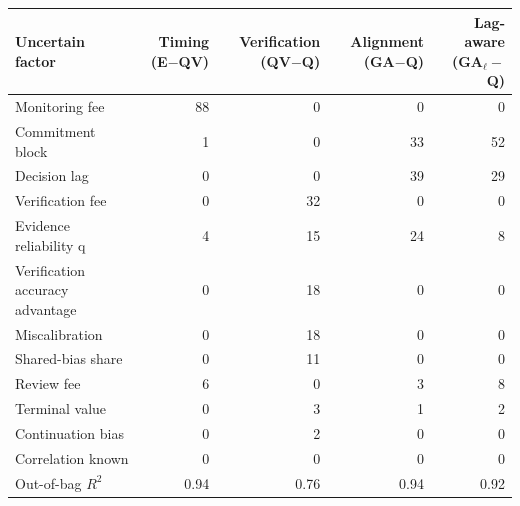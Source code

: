 \begin{tabular}{@{}lrrrr@{}}
\toprule
Uncertain factor & Timing (E$-$QV) & Verification (QV$-$Q) & Alignment (GA$-$Q) & Lag-aware (GA$_\ell-$Q) \\
\midrule
Monitoring fee & 88 & 0 & 0 & 0 \\
Commitment block & 1 & 0 & 33 & 52 \\
Decision lag & 0 & 0 & 39 & 29 \\
Verification fee & 0 & 32 & 0 & 0 \\
Evidence reliability q & 4 & 15 & 24 & 8 \\
Verification accuracy advantage & 0 & 18 & 0 & 0 \\
Miscalibration & 0 & 18 & 0 & 0 \\
Shared-bias share & 0 & 11 & 0 & 0 \\
Review fee & 6 & 0 & 3 & 8 \\
Terminal value & 0 & 3 & 1 & 2 \\
Continuation bias & 0 & 2 & 0 & 0 \\
Correlation known & 0 & 0 & 0 & 0 \\
\midrule
Out-of-bag $R^2$ & 0.94 & 0.76 & 0.94 & 0.92 \\
\bottomrule
\end{tabular}